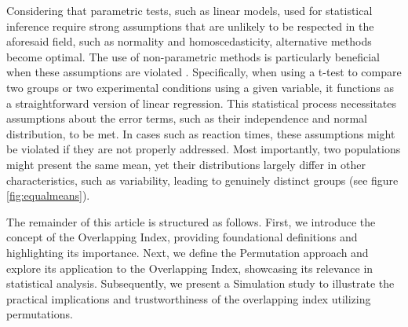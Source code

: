 \documentclass[twocolumn]{article}\usepackage[]{graphicx}\usepackage[]{xcolor}
\begin{document}
\vspace{0.2cm}
 Considering that parametric tests, such as linear models, used for statistical inference require strong assumptions that are unlikely to be respected in the aforesaid field, such as normality and homoscedasticity, alternative methods become optimal. The use of non-parametric methods is particularly beneficial when these assumptions are violated \cite{AAAA}. Specifically, when using a t-test to compare two groups or two experimental conditions using a given variable, it functions as a straightforward version of linear regression. This statistical process necessitates assumptions about the error terms, such as their independence and normal distribution, to be met. In cases such as reaction times, these assumptions might be violated if they are not properly addressed. Most importantly, two populations might present the same mean, yet their distributions largely differ in other characteristics, such as variability, leading to genuinely distinct groups (see figure \ref{fig:equalmeans}). 

\vspace{0.2cm}
The remainder of this article is structured as follows. First, we introduce the concept of the Overlapping Index, providing foundational definitions and highlighting its importance. Next, we define the Permutation approach and explore its application to the Overlapping Index, showcasing its relevance in statistical analysis. Subsequently, we present a Simulation study to illustrate the practical implications and trustworthiness of the overlapping index utilizing permutations.
\end{document}
